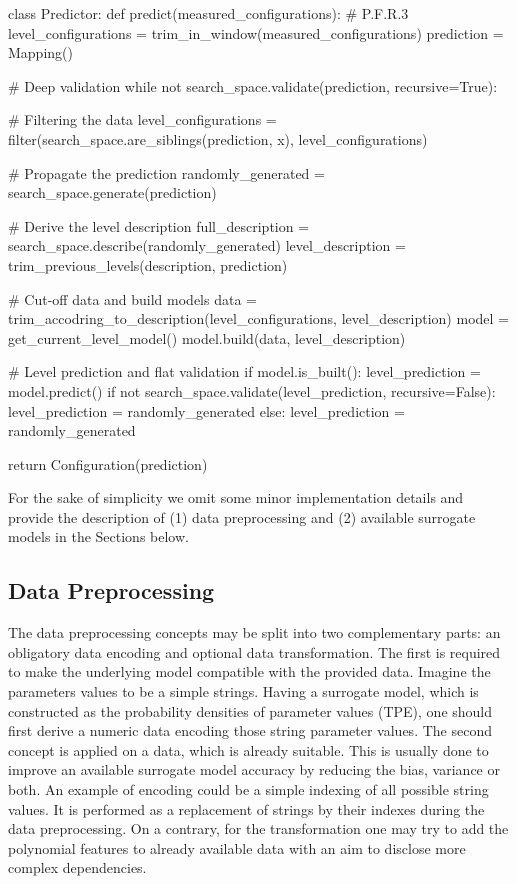 \begin{code}[language=Python, caption=P.F.R.1 + P.F.R.3 implementation pseudo-code., label=impl: P.F.R.1 + P.F.R.3 implementation pseudocode]
class Predictor:
	def predict(measured_configurations):
		# P.F.R.3
		level_configurations = trim_in_window(measured_configurations)
		prediction = Mapping()
		
		# Deep validation
		while not search_space.validate(prediction, recursive=True):
		
			# Filtering the data
			level_configurations = filter(search_space.are_siblings(prediction, x), level_configurations)
			
			# Propagate the prediction
			randomly_generated = search_space.generate(prediction)
			
			# Derive the level description
			full_description = search_space.describe(randomly_generated)
			level_description = trim_previous_levels(description, prediction)
			
			# Cut-off data and build models
			data = trim_accodring_to_description(level_configurations, level_description)
			model = get_current_level_model()
			model.build(data, level_description)
			
			# Level prediction and flat validation
			if model.is_built():
				level_prediction = model.predict()
				if not search_space.validate(level_prediction, recursive=False):
					level_prediction = randomly_generated
			else:
				level_prediction = randomly_generated
		
		return Configuration(prediction)
\end{code}

For the sake of simplicity we omit some minor implementation details and provide the description of (1) data preprocessing and (2) available surrogate models in the Sections below.

\subsection{Data Preprocessing}\label{impl: preprocessing}
The data preprocessing concepts may be split into two complementary parts: an obligatory data encoding and optional data transformation. The first is required to make the underlying model compatible with the provided data. Imagine the parameters values to be a simple strings. Having a surrogate model, which is constructed as the probability densities of parameter values (TPE), one should first derive a numeric data encoding those string parameter values. The second concept is applied on a data, which is already suitable. This is usually done to improve an available surrogate model accuracy by reducing the bias, variance or both. An example of encoding could be a simple indexing of all possible string values. It is performed as a replacement of strings by their indexes during the data preprocessing. On a contrary, for the transformation one may try to add the polynomial features to already available data with an aim to disclose more complex dependencies.

